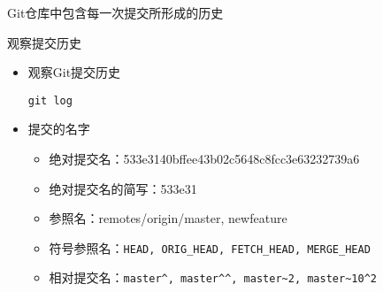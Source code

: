 \begin{frame}[<+->]{Git仓库中包含每一次提交所形成的历史}
\end{frame}

\begin{frame}[<+->][fragile]{观察提交历史}
  \begin{itemize}
    \item 观察Git提交历史
    \begin{Verbatim}[frame=single,commandchars=\\\{\}]
git log    
    \end{Verbatim}
    \item 提交的名字
    \begin{itemize}
        \item 绝对提交名：533e3140bffee43b02c5648c8fcc3e63232739a6
        \item 绝对提交名的简写：533e31
        \item 参照名：remotes/origin/master, newfeature
        \item 符号参照名：\verb|HEAD, ORIG_HEAD, FETCH_HEAD, MERGE_HEAD|
        \item 相对提交名：\verb|master^, master^^, master~2, master~10^2|
    \end{itemize}
  \end{itemize}
\end{frame}


